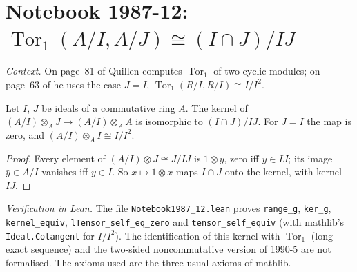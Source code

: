 \section[Notebook 1987-12: Tor of cyclic modules]{Notebook 1987-12: $\operatorname{Tor}_1(A/I, A/J) \cong (I \cap J)/IJ$\protect{}}\label{sec:quillen-1987-12}

\emph{Context.} On page~81 of  Quillen computes $\operatorname{Tor}_1$ of two cyclic modules; on page~63 of  he uses the case $J = I$, $\operatorname{Tor}_1(R/I, R/I) \cong I/I^2$.

\begin{encadre}
\begin{theoreme}\label{thm:quillen-1987-12}
Let $I$, $J$ be ideals of a commutative ring $A$. The kernel of $(A/I) \otimes_A J \to (A/I) \otimes_A A$ is isomorphic to $(I \cap J)/IJ$. For $J = I$ the map is zero, and $(A/I) \otimes_A I \cong I/I^2$.
\end{theoreme}
\end{encadre}

\begin{proof}
Every element of $(A/I) \otimes J \cong J/IJ$ is $1 \otimes y$, zero iff $y \in IJ$; its image $\bar y \in A/I$ vanishes iff $y \in I$. So $x \mapsto 1 \otimes x$ maps $I \cap J$ onto the kernel, with kernel $IJ$.
\end{proof}

\emph{Verification in Lean.} The file \href{\leanblobmain/Notebook1987_12.lean}{\texttt{Notebook1987\_12.\allowbreak{}lean}} proves \texttt{range\_g}, \texttt{ker\_g}, \texttt{kernel\_equiv}, \texttt{lTensor\_self\_eq\_zero} and \texttt{tensor\_self\_equiv} (with mathlib's \texttt{Ideal.Cotangent} for $I/I^2$). The identification of this kernel with $\operatorname{Tor}_1$ (long exact sequence) and the two-sided noncommutative version of 1990-5 are not formalised. The axioms used are the three usual axioms of mathlib.

